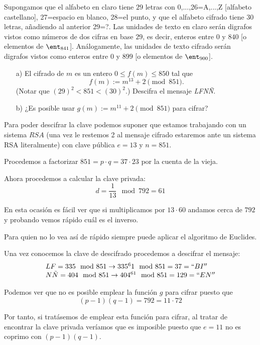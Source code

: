 \begin{problem}[6]
Supongamos que el alfabeto en claro tiene $29$ letras con
0,...,26=A,...,Z [alfabeto castellano], 27=espacio en blanco,
28=el punto, y que el alfabeto cifrado tiene $30$ letras,
añadiendo al anterior 29=?.   Las unidades de texto en claro serán
digrafos vistos como números de dos cifras en base $29$, es decir,
enteros entre $0$ y $840$ [o elementos de $\ent_{841}$].
Análogamente, las unidades de texto cifrado serán digrafos vistos
como enteros entre $0$ y $899$ [o elementos de $\ent_{900}$].
\begin{itemize}
\item[a)] El cifrado de $m$ es un entero $0\le f(m)\le  850$ tal que
$$f(m):=m^{13}+2 \pmod {851}.$$ (Notar que $(29)^2<851<(30)^2$.)
 Descifra el mensaje {\it LFNÑ}.
\item[b)]  ¿Es posible usar $g(m):=m^{11}+2 \pmod{851}$ para cifrar?
\end{itemize}
\solution


\spart

Para poder descifrar la clave podemos suponer que estamos trabajando con un sistema $RSA$ (una vez le restemos 2 al mensaje cifrado estaremos ante un sistema RSA literalmente) con clave pública $e=13$ y $n=851$.

Procedemos a factorizar $851=p\cdot q = 37 \cdot 23$ por la cuenta de la vieja.

Ahora procedemos a calcular la clave privada:
\[d=\frac{1}{13} \mod 792 = 61\]

En esta ocasión es fácil ver que si multiplicamos por $13\cdot 60$ andamos cerca de $792$ y probando vemos rápido cuál es el inverso.

Para quien no lo vea así de rápido siempre puede aplicar el algoritmo de Euclides.

Una vez conocemos la clave de descifrado procedemos a descifrar el mensaje:
\[\begin{array}{l}
LF = 335 \mod 851 \to 335^61 \mod 851 = 37 = ``BI''\\
N\tilde{N} = 404 \mod 851 \to 404^{61} \mod 851 = 129 = ``EN''
\end{array}\]

\spart

Podemos ver que no es posible emplear la función $g$ para cifrar puesto que
\[(p-1)(q-1) = 792 = 11\cdot 72\]

Por tanto, si tratásemos de emplear esta función para cifrar, al tratar de encontrar la clave privada veríamos que es imposible puesto que $e=11$ no es coprimo con $(p-1)(q-1)$.

 \end{problem}

